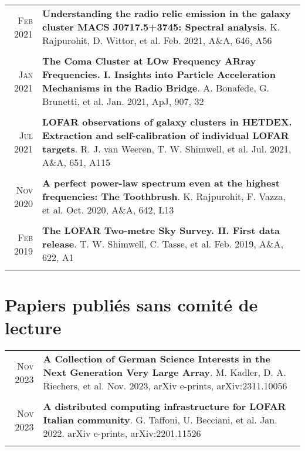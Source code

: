 \documentclass[11pt,a4paper,notitlepage]{article}
\begin{document}
\begin{tabular}{r|p{16.5cm}}
	\textsc{Feb 2021} & \textbf{Understanding the radio relic emission in the galaxy cluster MACS J0717.5+3745: Spectral analysis}. K. Rajpurohit, D. Wittor, et al. Feb. 2021, A\&A, 646, A56 \\
	\multicolumn{2}{c}{} \\
	
	\textsc{Jan 2021} & \textbf{The Coma Cluster at LOw Frequency ARray Frequencies. I. Insights into Particle Acceleration Mechanisms in the Radio Bridge}. A. Bonafede, G. Brunetti, et al. Jan. 2021, ApJ, 907, 32 \\
	\multicolumn{2}{c}{} \\
	
	
	\textsc{Jul 2021} & \textbf{LOFAR observations of galaxy clusters in HETDEX. Extraction and self-calibration of individual LOFAR targets}. R. J. van Weeren, T. W. Shimwell, et al. Jul. 2021, A\&A, 651, A115\\
	\multicolumn{2}{c}{} \\
	
	\textsc{Nov 2020} & \textbf{A perfect power-law spectrum even at the highest frequencies: The Toothbrush}. K. Rajpurohit, F. Vazza, et al. Oct. 2020, A\&A, 642, L13 \\
	\multicolumn{2}{c}{} \\
	
	\textsc{Feb 2019} & \textbf{The LOFAR Two-metre Sky Survey. II. First data release}. T. W. Shimwell, C. Tasse, et al. Feb. 2019, A\&A, 622, A1\\
	\multicolumn{2}{c}{} \\

\end{tabular}


\section{Papiers publi\'es sans comit\'e de lecture}

\begin{tabular}{r|p{16.5cm}}
	\textsc{Nov 2023} & \textbf{A Collection of German Science Interests in the Next Generation Very Large Array}. M. Kadler, D. A. Riechers, et al. Nov. 2023, arXiv e-prints, arXiv:2311.10056\\
	\multicolumn{2}{c}{} \\

	\textsc{Nov 2023} & \textbf{A distributed computing infrastructure for LOFAR Italian community}. G. Taffoni, U. Becciani, et al. Jan. 2022. arXiv e-prints, arXiv:2201.11526\\
\multicolumn{2}{c}{} \\


\end{tabular}
\end{document}
